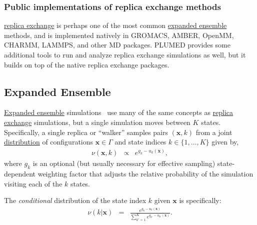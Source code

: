 \documentclass[9pt,review]{livecoms}
\newcommand{\vx}{\mathbf{x}}
\begin{document}
\subsubsection{Public implementations of replica exchange methods}

\hyperlink{ref:ReplEx} {replica exchange} is perhaps one of the most common \hyperlink{ref:ExpEns} {expanded ensemble} methods, and is implemented natively in GROMACS, AMBER, OpenMM, CHARMM, LAMMPS, and other MD packages. PLUMED provides some additional tools to run and analyze replica exchange simulations as well, but it builds on top of the native replica exchange packages.

\subsection{Expanded Ensemble}
\hyperlink{ref:ExpEns} {Expanded ensemble} simulations~\cite{lyubartsev:jcp:1992:expanded-ensembles} use many of the same concepts as \hyperlink{ref:ReplEx} {replica exchange} simulations, but a single simulation moves between $K$ states. Specifically, a single replica or ``walker'' samples pairs $(\vx,k)$ from a joint \hyperlink{ref:Distribution} {distribution}  of configurations $\vx \in \Gamma$ and state indices $k \in \{1,\ldots,K\}$ given by,
\begin{eqnarray}
\nu(\vx,k) &\propto& e^{g_k-u_k(\vx)},
\end{eqnarray}
where $g_k$ is an optional (but usually necessary for effective sampling) state-dependent weighting factor that adjusts the relative probability of the simulation visiting each of the $k$ states.

The \emph{conditional} distribution of the state index $k$ given $\vx$ is specifically:
\begin{eqnarray}
\nu(k | \vx) &=& \frac{e^{g_k - u_k(\vx)}}{\sum\limits_{k'=1}^K e^{g_{k'} - u_{k'}(\vx)}}.
\end{eqnarray}
\end{document}
